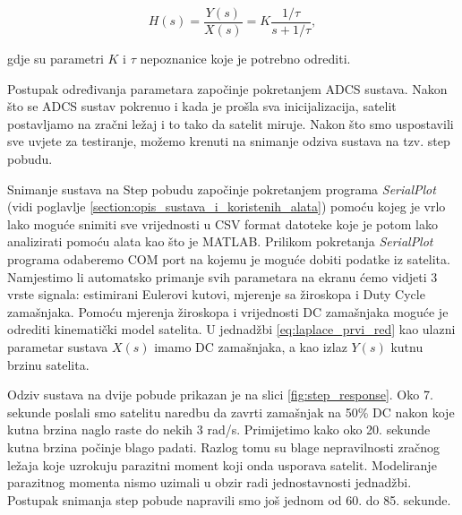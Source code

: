 \documentclass[times, utf8, diplomski, numeric]{templates/template}
\begin{document}
{{{            \begin{equation}
                H(s) = \frac{Y(s)}{X(s)} = K \frac{1/\tau}{s + 1/\tau},
            \end{equation}

            gdje su parametri $K$ i $\tau$ nepoznanice koje je potrebno odrediti. 
            
            Postupak određivanja parametara započinje pokretanjem ADCS sustava. Nakon što se ADCS sustav pokrenuo i kada je prošla sva inicijalizacija, satelit postavljamo na zračni ležaj i to tako da satelit miruje. Nakon što smo uspostavili sve uvjete za testiranje, možemo krenuti na snimanje odziva sustava na tzv. step pobudu.

            Snimanje sustava na Step pobudu započinje pokretanjem programa \emph{SerialPlot} (vidi poglavlje \ref{section:opis_sustava_i_koristenih_alata}) pomoću kojeg je vrlo lako moguće snimiti sve vrijednosti u CSV format datoteke koje je potom lako analizirati pomoću alata kao što je MATLAB. Prilikom pokretanja \emph{SerialPlot} programa odaberemo COM port na kojemu je moguće dobiti podatke iz satelita. Namjestimo li automatsko primanje svih parametara na ekranu ćemo vidjeti 3 vrste signala: estimirani Eulerovi kutovi, mjerenje sa žiroskopa i Duty Cycle zamašnjaka. Pomoću mjerenja žiroskopa i vrijednosti DC zamašnjaka moguće je odrediti kinematički model satelita. U jednadžbi \ref{eq:laplace_prvi_red} kao ulazni parametar sustava $X(s)$ imamo DC zamašnjaka, a kao izlaz $Y(s)$ kutnu brzinu satelita. 

            Odziv sustava na dvije pobude prikazan je na slici \ref{fig:step_response}. Oko 7. sekunde poslali smo satelitu naredbu da zavrti zamašnjak na 50\% DC nakon koje kutna brzina naglo raste do nekih 3 rad/s. Primijetimo kako oko 20. sekunde kutna brzina počinje blago padati. Razlog tomu su blage nepravilnosti zračnog ležaja koje uzrokuju parazitni moment koji onda usporava satelit. Modeliranje parazitnog momenta nismo uzimali u obzir radi jednostavnosti jednadžbi. Postupak snimanja step pobude napravili smo još jednom od 60. do 85. sekunde.

}}}
\end{document}
